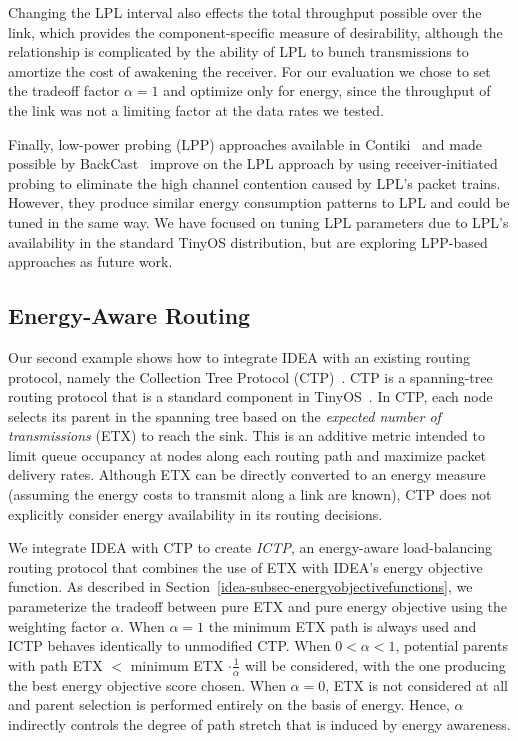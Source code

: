 Changing the LPL interval also effects the total throughput possible over the
link, which provides the component-specific measure of desirability, although
the relationship is complicated by the ability of LPL to bunch transmissions
to amortize the cost of awakening the receiver. For our evaluation we chose
to set the tradeoff factor $\alpha=1$ and optimize only for energy, since the
throughput of the link was not a limiting factor at the data rates we tested.

Finally, low-power probing (LPP) approaches available in
Contiki~\cite{contiki} and made possible by BackCast~\cite{backcast-hotnets}
improve on the LPL approach by using receiver-initiated probing to eliminate
the high channel contention caused by LPL's packet trains. However, they
produce similar energy consumption patterns to LPL and could be tuned in the
same way. We have focused on tuning LPL parameters due to LPL's availability
in the standard TinyOS distribution, but are exploring LPP-based approaches
as future work.

\subsection{Energy-Aware Routing}

Our second example shows how to integrate IDEA with an existing routing
protocol, namely the Collection Tree Protocol (CTP)~\cite{ctp-sensys09}. CTP
is a spanning-tree routing protocol that is a standard component in
TinyOS~\cite{tinyos-asplos00}.  In CTP, each node selects its parent in the
spanning tree based on the {\em expected number of transmissions} (ETX) to
reach the sink. This is an additive metric intended to limit queue occupancy
at nodes along each routing path and maximize packet delivery rates. Although
ETX can be directly converted to an energy measure (assuming the energy costs
to transmit along a link are known), CTP does not explicitly consider energy
availability in its routing decisions.

We integrate IDEA with CTP to create {\em ICTP}, an energy-aware
load-balancing routing protocol that combines the use of ETX with IDEA's
energy objective function.  As described in
Section~\ref{idea-subsec-energyobjectivefunctions}, we parameterize the tradeoff
between pure ETX and pure energy objective using the weighting factor
$\alpha$.  When $\alpha = 1$ the minimum ETX path is always used and ICTP
behaves identically to unmodified CTP. When $0 < \alpha < 1$, potential
parents with path ETX $<$ minimum ETX $\cdot \frac{1}{\alpha}$ will be
considered, with the one producing the best energy objective score chosen.
When $\alpha = 0$, ETX is not considered at all and parent selection is
performed entirely on the basis of energy.  Hence, $\alpha$ indirectly
controls the degree of path stretch that is induced by energy awareness. 

